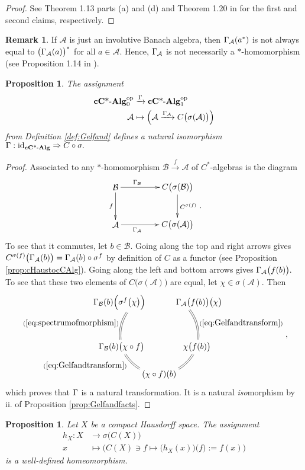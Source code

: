 \documentclass[12pt]{article}
\edef\t{\pgfmathresult}%
\theoremstyle{theorem}
\newtheorem{proposition}[equation]{Proposition}
\theoremstyle{definition}
\newtheorem{remark}[equation]{Remark}
\numberwithin{equation}{section}
\let\s=\sigma \let\t=\tau \let\u=\upsilon \let\f=\phi \let\c=\chi
\newcommand{\be}{\begin{equation}}
\newcommand{\ee}{\end{equation}}
\newcommand{\bn}{\begin{proposition}}
\newcommand{\en}{\end{proposition}}
\newcommand{\bprf}{\begin{proof}}
\newcommand{\eprf}{\end{proof}}
\newcommand{\br}{\begin{remark}}
\newcommand{\er}{\end{remark}}
\newcommand{\<}{\langle}
\renewcommand{\>}{\rangle}
\newcommand{\id}{\mathrm{id}}
\newcommand{\cCAlg}{\mathbf{cC\text{*-}Alg}}
\def\mA{{{\mathcal{A}}}}
\def\mB{{{\mathcal{B}}}}
\newcommand{\op}{\mathrm{op}}
\begin{document}
\bprf
See
Theorem 1.13 parts (a) and (d)
and Theorem 1.20 in \cite{Fo94}
for the first and second claims, respectively. 
\eprf

\br
If $\mA$ is just an involutive Banach algebra, then 
$\G_{\mA}(a^*)$ is not always equal to 
$\big(\G_{\mA}(a)\big)^*$ for all $a\in\mA.$ Hence, $\G_{\mA}$
is not necessarily a $*$-homomorphism
(see Proposition 1.14 in \cite{Fo94}). 
\er

\bn
\label{prop:Gelfandtransform}
The assignment
\be
\begin{split}
\cCAlg^{\op}_{0}&\xrightarrow{\G}\cCAlg^{\op}_{1}\\
\mA&\mapsto\Big(\mA
\xrightarrow{\G_{\mA}}C\big(\s(\mA)\big)\Big)
\end{split}
\ee
from Definition \ref{def:Gelfand}
defines a natural isomorphism 
$\G:\id_{\cCAlg}\Rightarrow C\circ\s.$ 
\en

\bprf
Associated to any $*$-homomorphism $\mB\xrightarrow{f}\mA$
of $C^*$-algebras is the diagram
\be
\xy0;/r.25pc/:
(-12.5,7.5)*+{\mB}="A1";
(-12.5,-7.5)*+{\mA}="A2";
(12.5,7.5)*+{C\big(\s(\mB)\big)}="CsA1";
(12.5,-7.5)*+{C\big(\s(\mA)\big)}="CsA2";
{\ar"A1";"A2"_{f}};
{\ar"CsA1";"CsA2"^{C^{\s(f)}}};
{\ar"A1";"CsA1"^(0.35){\G_{\mB}}};
{\ar"A2";"CsA2"_(0.35){\G_{\mA}}};
\endxy
.
\ee
To see that it commutes, let $b\in\mB.$
Going along the top and right arrows gives
$
C^{\s(f)}\big(\G_{\mA}(b)\big)
=\G_{\mA}(b)\circ\s^{f}
$
by definition of $C$ as a functor
(see Proposition \ref{prop:cHaustocCAlg}).
Going along the left and bottom arrows
gives
$
\G_{\mA}\big(f(b)\big).
$
To see that these two elements of
$C\big(\s(\mA)\big)$ 
are equal, let $\chi\in\s(\mA).$
Then
\be
\xy0;/r.20pc/:
(11.7557,16.1803)*+{\qquad\qquad
\G_{\mA}\big(f(b)\big)\big(\chi\big)}="1";
(19.0211,-6.1803)*+{\chi\big(f(b)\big)}="2";
(0,-20)*+{(\chi\circ f)(b)}="3";
(-19.0211,-6.1803)*+{\G_{\mB}(b)\big(\chi\circ f\big)}="4";
(-11.7557,16.1803)*+{
\G_{\mB}(b)\Big(\s^{f}\big(\chi\big)\Big)
\qquad\qquad}="5";
{\ar@{=}@/^0.7pc/"1";"2"^(0.55){(\ref{eq:Gelfandtransform})}};
{\ar@{=}@/^0.7pc/"2";"3"};
{\ar@{=}@/^0.7pc/"3";"4"^(0.70){(\ref{eq:Gelfandtransform})}};
{\ar@{=}@/^0.7pc/"4";"5"^(0.45){(\ref{eq:spectrumofmorphism})}};
\endxy
,
\ee
which proves that $\Gamma$ is a natural transformation. It is a natural 
{\emph{iso}morphism} by ii. of Proposition \ref{prop:Gelfandfacts}.
\eprf

\bn
\label{prop:evhomeo}
Let $X$ be a compact Hausdorff space.
The assignment
\be
\label{eq:evaluation}
\begin{split}
h_{X} : X &\to \s\big(C(X)\big) \\
x &\mapsto\Big(C(X)\ni f\mapsto\big(h_{X}(x)\big)\big(f\big)
:=f(x)\Big)
\end{split}
\ee
is a well-defined homeomorphism.
\en
\end{document}
